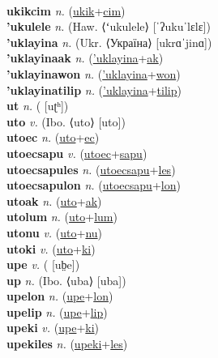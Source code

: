  \label{ukikak} \\
\textbf{ukikcim} \textit{n.} (\hyperref[ukik]{ukik}+\hyperref[cim]{cim})
 \label{ukikcim} \\
\textbf{'ukulele} \textit{n.} (Haw. ⟨ʻukulele⟩ [ˈʔukuˈlɛlɛ])
 \label{'ukulele} \\
\textbf{'uklayina} \textit{n.} (Ukr. ⟨Україна⟩ [ukrɑˈjinɑ])
 \label{'uklayina} \\
\textbf{'uklayinaak} \textit{n.} (\hyperref['uklayina]{'uklayina}+\hyperref[ak]{ak})
 \label{'uklayinaak} \\
\textbf{'uklayinawon} \textit{n.} (\hyperref['uklayina]{'uklayina}+\hyperref[won]{won})
 \label{'uklayinawon} \\
\textbf{'uklayinatilip} \textit{n.} (\hyperref['uklayina]{'uklayina}+\hyperref[tilip]{tilip})
 \label{'uklayinatilip} \\
\textbf{ut} \textit{n.} ( [uʈʰ])
 \label{ut} \\
\textbf{uto} \textit{v.} (Ibo. ⟨uto⟩ [uto])
 \label{uto} \\
\textbf{utoec} \textit{n.} (\hyperref[uto]{uto}+\hyperref[ec]{ec})
 \label{utoec} \\
\textbf{utoecsapu} \textit{v.} (\hyperref[utoec]{utoec}+\hyperref[sapu]{sapu})
 \label{utoecsapu} \\
\textbf{utoecsapules} \textit{n.} (\hyperref[utoecsapu]{utoecsapu}+\hyperref[les]{les})
 \label{utoecsapules} \\
\textbf{utoecsapulon} \textit{n.} (\hyperref[utoecsapu]{utoecsapu}+\hyperref[lon]{lon})
 \label{utoecsapulon} \\
\textbf{utoak} \textit{n.} (\hyperref[uto]{uto}+\hyperref[ak]{ak})
 \label{utoak} \\
\textbf{utolum} \textit{n.} (\hyperref[uto]{uto}+\hyperref[lum]{lum})
 \label{utolum} \\
\textbf{utonu} \textit{v.} (\hyperref[uto]{uto}+\hyperref[nu]{nu})
 \label{utonu} \\
\textbf{utoki} \textit{v.} (\hyperref[uto]{uto}+\hyperref[ki]{ki})
 \label{utoki} \\
\textbf{upe} \textit{v.} ( [ub̤e])
 \label{upe} \\
\textbf{up} \textit{n.} (Ibo. ⟨uba⟩ [uba])
 \label{up} \\
\textbf{upelon} \textit{n.} (\hyperref[upe]{upe}+\hyperref[lon]{lon})
 \label{upelon} \\
\textbf{upelip} \textit{n.} (\hyperref[upe]{upe}+\hyperref[lip]{lip})
 \label{upelip} \\
\textbf{upeki} \textit{v.} (\hyperref[upe]{upe}+\hyperref[ki]{ki})
 \label{upeki} \\
\textbf{upekiles} \textit{n.} (\hyperref[upeki]{upeki}+\hyperref[les]{les})
 \label{upekiles} 

